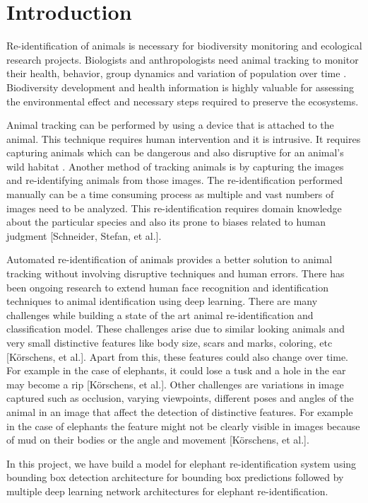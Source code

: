 \documentclass[10pt,twocolumn,letterpaper]{article}
\begin{document}
\section{Introduction}
\label{sec:intro}

Re-identification of animals is necessary for biodiversity monitoring and ecological research projects. Biologists and anthropologists need animal tracking to monitor their health, behavior, group dynamics and variation of population over time \cite{Deb}. Biodiversity development and health information is highly valuable for assessing the environmental effect and necessary steps required to preserve the ecosystems.

Animal tracking can be performed by using a device that is attached to the animal. This technique requires human intervention and it is intrusive. It requires capturing animals which can be dangerous and also disruptive for an animal's wild habitat \cite{Deb}. Another method of tracking animals is by capturing the images and re-identifying animals from those images. The re-identification performed manually can be a time consuming process as multiple and vast numbers of images need to be analyzed. This re-identification requires domain knowledge about the particular species and also its prone to biases related to human judgment [Schneider, Stefan, et al.]. \cite{SchneiReidentify}

Automated re-identification of animals provides a better solution to animal tracking without involving disruptive techniques and human errors. There has been ongoing research to extend human face recognition and identification techniques to animal identification using deep learning. There are many challenges while building a state of the art animal re-identification and classification model. These challenges arise due to similar looking animals and very small distinctive features like body size, scars and marks, coloring, etc [Körschens, et al.]. Apart from this, these features could also change over time. For example in the case of elephants, it could lose a tusk and a hole in the ear may become a rip [Körschens, et al.]. Other challenges are variations in image captured such as occlusion, varying viewpoints, different poses and angles of the animal in an image that affect the detection of distinctive features. For example in the case of elephants the feature might not be clearly visible in images because of mud on their bodies or the angle and movement [Körschens, et al.].

In this project, we have build a model for elephant re-identification system using bounding box detection architecture for bounding box predictions followed by multiple deep learning network architectures for elephant re-identification.
\end{document}
